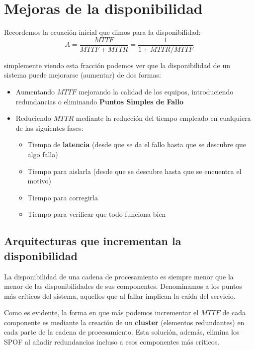 \section{Mejoras de la disponibilidad}

Recordemos la ecuación inicial que dimos para la disponibilidad:
\[A=\frac{MTTF}{MTTF+MTTR}=\frac{1}{1+MTTR/MTTF}\]

simplemente viendo esta fracción podemos ver que la disponibilidad de un sistema puede mejorarse (aumentar) de dos formas:
\begin{itemize}
\item Aumentando $MTTF$ mejorando la calidad de los equipos, introduciendo redundancias o eliminando \textbf{Puntos Simples de Fallo}

\item Reduciendo $MTTR$ mediante la reducción del tiempo empleado en cualquiera de las siguientes fases:
\begin{itemize}
\item Tiempo de \textbf{latencia} (desde que se da el fallo hasta que se descubre que algo falla)

\item Tiempo para aislarla (desde que se descubre hasta que se encuentra el motivo)

\item Tiempo para corregirla

\item Tiempo para verificar que todo funciona bien
\end{itemize}
\end{itemize}

\subsection{Arquitecturas que incrementan la disponibilidad}

La disponibilidad de una cadena de procesamiento es siempre menor que la menor de las disponibilidades de sus componentes. Denominamos  a los puntos más críticos del sistema, aquellos que al fallar implican la caída del servicio.

Como es evidente, la forma en que más podemos incrementar el $MTTF$ de cada componente es mediante la creación de un \textbf{cluster} (elementos redundantes) en cada parte de la cadena de procesamiento. Esta solución, además, elimina los SPOF al añadir redundancias incluso a esos componentes más críticos.

